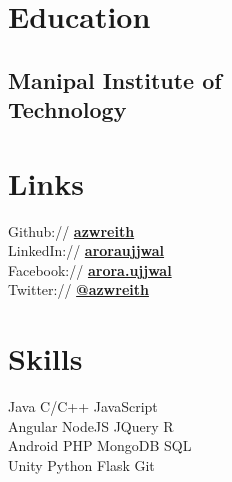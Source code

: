 \documentclass[a4paper]{resume}
\begin{document}
\begin{minipage}[t]{0.33\textwidth} %


\section{Education}

\subsection{Manipal Institute of \\ Technology}


\sectionspace %



\section{Links}

Github:// \href{https://github.com/azwreith}{\bf azwreith} \\
LinkedIn:// \href{https://in.linkedin.com/in/aroraujjwal}{\bf aroraujjwal} \\
Facebook:// \href{https://www.facebook.com/arora.ujjwal}{\bf arora.ujjwal} \\
Twitter:// \href{https://twitter.com/DarthUjj}{\bf @azwreith} \\

\sectionspace %



\section{Skills}

Java \textbullet{} C/C++ \textbullet{}  JavaScript \\
Angular \textbullet{} NodeJS \textbullet{} JQuery  \textbullet{} R\\
Android \textbullet{} PHP \textbullet{} MongoDB \textbullet{} SQL \\
Unity \textbullet{} Python \textbullet{} Flask \textbullet{} Git \\


\end{minipage}
\end{document}
